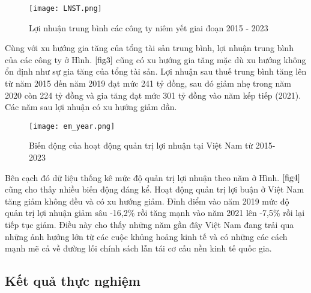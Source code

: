 \documentclass[a4paper]{article}
\begin{document}
\begin{figure}[!h]
\begin{center}
\texttt{[image: LNST.png]}\\
\caption{Lợi nhuận trung bình các công ty niêm yết giai đoạn 2015 - 2023}
 \label{fig3}
\end{center}
\end{figure}
Cùng với xu hướng gia tăng của tổng tài sản trung bình, lợi nhuận trung bình của các công ty ở Hình. $\ref{fig3}$ cũng có xu hướng gia tăng mặc dù xu hướng không ổn định như sự gia tăng của tổng tài sản. Lợi nhuận sau thuế trung bình tăng lên từ năm 2015 đến năm 2019 đạt mức 241 tỷ đồng, sau đó giảm nhẹ trong năm 2020 còn 224 tỷ đồng và gia tăng đạt mức 301 tỷ đồng vào năm kếp tiếp (2021). Các năm sau lợi nhuận có xu hướng giảm dần.\\

\begin{figure}[!h]
\begin{center}
\texttt{[image: em\_year.png]}\\
\caption{Biến động của hoạt động quản trị lợi nhuận tại Việt Nam từ 2015-2023} \label{fig4}
\end{center}
\end{figure}

\indent Bên cạch đó dữ liệu thống kê mức độ quản trị lợi nhuận theo năm ở Hình. $\ref{fig4}$ cũng cho thấy nhiều biến động đáng kể. Hoạt động quản trị lợi  buận ở Việt Nam tăng giảm không đều và có xu hướng giảm. Đỉnh điểm vào năm 2019 mức độ quản trị lợi nhuận giảm sâu -16,2\% rồi tăng mạnh vào năm 2021 lên -7,5\% rồi lại tiếp tục giảm. Điều này cho thấy những năm gần đây Việt Nam đang trải qua những ảnh hưởng lớn từ các cuộc khủng hoảng kinh tế và có những các cách mạnh mẽ cả về đường lối chính sách lẫn tái cơ cấu nền kinh tế quốc gia.
\subsection{Kết quả thực nghiệm}
\end{document}
